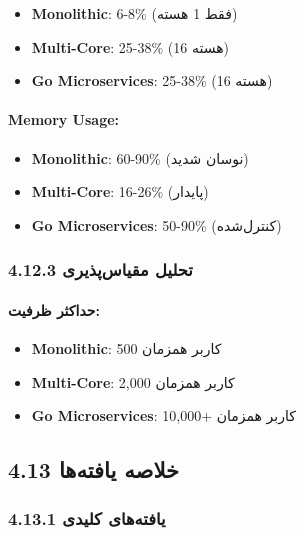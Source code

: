\documentclass[
]{article}
\providecommand{\tightlist}{%
  \setlength{\itemsep}{0pt}\setlength{\parskip}{0pt}}
\begin{document}
\begin{itemize}
\tightlist
\item
  \textbf{Monolithic}: 6-8\% (فقط 1 هسته)
\item
  \textbf{Multi-Core}: 25-38\% (16 هسته)
\item
  \textbf{Go Microservices}: 25-38\% (16 هسته)
\end{itemize}

\paragraph{Memory Usage:}\label{memory-usage}

\begin{itemize}
\tightlist
\item
  \textbf{Monolithic}: 60-90\% (نوسان شدید)
\item
  \textbf{Multi-Core}: 16-26\% (پایدار)
\item
  \textbf{Go Microservices}: 50-90\% (کنترل‌شده)
\end{itemize}

\subsubsection{4.12.3 تحلیل
مقیاس‌پذیری}\label{ux62aux62dux644ux6ccux644-ux645ux642ux6ccux627ux633ux67eux630ux6ccux631ux6cc-2}

\paragraph{حداکثر
ظرفیت:}\label{ux62dux62fux627ux6a9ux62bux631-ux638ux631ux641ux6ccux62a-1}

\begin{itemize}
\tightlist
\item
  \textbf{Monolithic}: 500 کاربر همزمان
\item
  \textbf{Multi-Core}: 2,000 کاربر همزمان
\item
  \textbf{Go Microservices}: 10,000+ کاربر همزمان
\end{itemize}

\subsection{4.13 خلاصه
یافته‌ها}\label{ux62eux644ux627ux635ux647-ux6ccux627ux641ux62aux647ux647ux627}

\subsubsection{4.13.1 یافته‌های
کلیدی}\label{ux6ccux627ux641ux62aux647ux647ux627ux6cc-ux6a9ux644ux6ccux62fux6cc}
\end{document}
